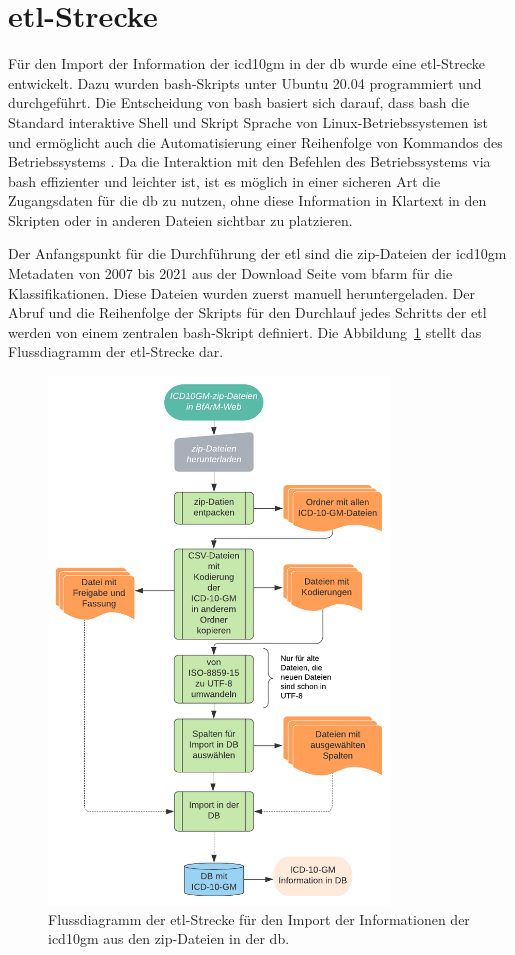 \section{\acs{etl}-Strecke} \label{sec:etlpipeline}

Für den Import der Information der \ac{icd10gm} in der \ac{db} wurde eine \ac{etl}-Strecke entwickelt. Dazu wurden \ac{bash}-Skripts unter Ubuntu 20.04 programmiert und durchgeführt. Die Entscheidung von \ac{bash} basiert sich darauf, dass \ac{bash} die Standard interaktive Shell und Skript Sprache von Linux-Betriebssystemen ist und ermöglicht auch die Automatisierung einer Reihenfolge von Kommandos des Betriebssystems \cite{bash}. Da die Interaktion mit den Befehlen des Betriebssystems via \ac{bash} effizienter und leichter ist, ist es möglich in einer sicheren Art die Zugangsdaten für die \ac{db} zu nutzen, ohne diese Information in Klartext in den Skripten oder in anderen Dateien sichtbar zu platzieren.

Der Anfangspunkt für die Durchführung der \ac{etl} sind die \ac{zip}-Dateien der \ac{icd10gm} Metadaten von 2007 bis 2021 aus der Download Seite vom \ac{bfarm} für die Klassifikationen. Diese Dateien wurden zuerst manuell heruntergeladen. Der Abruf und die Reihenfolge der Skripts für den Durchlauf jedes Schritts der \ac{etl} werden von einem zentralen \ac{bash}-Skript definiert. Die Abbildung~\ref{fig:etl} stellt das Flussdiagramm der \ac{etl}-Strecke dar.

\clearpage
\begin{figure}[ht]
	\centering
	\includegraphics[height=14cm]{figures/etl}
	\caption[\acs{etl}-Strecke]{Flussdiagramm der \acs{etl}-Strecke für den Import der Informationen der \ac{icd10gm} aus den \ac{zip}-Dateien in der \ac{db}.}
	\label{fig:etl}
\end{figure} 

